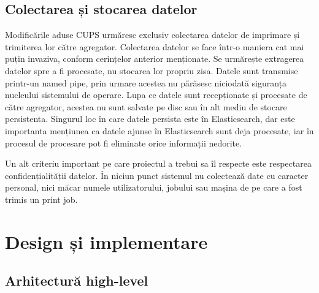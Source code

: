 \documentclass[a4paper, 12pt, twoside]{report}
\begin{document}
	\section{Colectarea și stocarea datelor}
Modificările aduse CUPS urmăresc exclusiv colectarea datelor de imprimare și trimiterea lor către agregator. Colectarea datelor se face într-o maniera cat mai puțin invaziva, conform cerințelor anterior menționate. Se urmărește extragerea datelor spre a fi procesate, nu stocarea lor propriu zisa. Datele sunt transmise printr-un named pipe, prin urmare acestea nu părăsesc niciodată siguranța nucleului sistemului de operare. Lupa ce datele sunt recepționate și procesate de către agregator, acestea nu sunt salvate pe disc sau în alt mediu de stocare persistenta. Singurul loc în care datele persista este în Elasticsearch, dar este importanta mențiunea ca datele ajunse în Elasticsearch sunt deja procesate, iar în procesul de procesare pot fi eliminate orice informații nedorite.

Un alt criteriu important pe care proiectul a trebui sa îl respecte este respectarea confidențialității datelor. În niciun punct sistemul nu colectează date cu caracter personal, nici măcar numele utilizatorului, jobului sau mașina de pe care a fost trimis un print job. 


\chapter{Design și implementare}

	\section{Arhitectură high-level}
\end{document}
